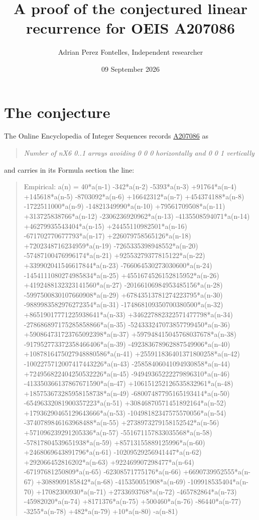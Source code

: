 \documentclass[11pt]{article}
\title{A proof of the conjectured linear recurrence for OEIS A207086}
\author{Adrian Perez Fontelles, Independent researcher}
\date{09 September 2026}
\theoremstyle{definition}
\begin{document}
\maketitle
\section{The conjecture}

The Online Encyclopedia of Integer Sequences records \href{https://oeis.org/A207086}{A207086} as

\begin{quote}\itshape Number of nX6 0..1 arrays avoiding 0 0 0 horizontally and 0 0 1 vertically\end{quote}

and carries in its Formula section the line:

\begin{quote}\ttfamily Empirical: a(n) = 40*a(n-1) -342*a(n-2) -5393*a(n-3) +91764*a(n-4) +145618*a(n-5) -8703092*a(n-6) +16642312*a(n-7) +454374188*a(n-8) -1722511000*a(n-9) -14821349990*a(n-10) +79561709508*a(n-11) +313725838766*a(n-12) -2306236920962*a(n-13) -4135508594071*a(n-14) +46279935543404*a(n-15) +24455110982501*a(n-16) -671702770677793*a(n-17) +226079758565126*a(n-18) +7202348716234959*a(n-19) -7265335398948552*a(n-20) -57487100476996174*a(n-21) +92553279377815122*a(n-22) +339902041546617844*a(n-23) -766064530273030600*a(n-24) -1454111080274985834*a(n-25) +4551674526152815952*a(n-26) +4192488132323141560*a(n-27) -20166106984953485156*a(n-28) -5997500830107660908*a(n-29) +67843513781274223795*a(n-30) -9889983582976272354*a(n-31) -174868109350700380500*a(n-32) +86519017771225938641*a(n-33) +346227882322571477798*a(n-34) -278686897175285858866*a(n-35) -524333247073857799450*a(n-36) +590864731723765092398*a(n-37) +597948415045768037678*a(n-38) -917952773372358466406*a(n-39) -492383678962887549906*a(n-40) +1087816475027948880586*a(n-41) +255911836401371800258*a(n-42) -1002275712007417443226*a(n-43) -25858406041094930858*a(n-44) +724956822404250532226*a(n-45) -94949365222279896310*a(n-46) -413350366137867671590*a(n-47) +106151252126535832961*a(n-48) +185753673285958158738*a(n-49) -68007487795165193414*a(n-50) -65496332081900357223*a(n-51) +30846870571451892164*a(n-52) +17936290465129643666*a(n-53) -10498182347575570056*a(n-54) -3740789846163968488*a(n-55) +2738973279158152542*a(n-56) +571096239291205336*a(n-57) -551671157833035568*a(n-58) -57817804539651938*a(n-59) +85713155889125996*a(n-60) +2468069643891796*a(n-61) -10209529256941447*a(n-62) +292066452816202*a(n-63) +922469907298477*a(n-64) -67197681250809*a(n-65) -62308571775176*a(n-66) +6690739952555*a(n-67) +3088909185842*a(n-68) -415350051908*a(n-69) -109918535404*a(n-70) +17082300930*a(n-71) +2733693768*a(n-72) -465782864*a(n-73) -45982020*a(n-74) +8171376*a(n-75) +500460*a(n-76) -86440*a(n-77) -3255*a(n-78) +482*a(n-79) +10*a(n-80) -a(n-81)\end{quote}
\end{document}
